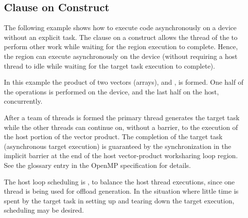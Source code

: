 \subsection{ Clause on  Construct}
\label{subsec:target_nowait_clause}

The following example shows how to execute code asynchronously on a 
device without an explicit task. The  clause on a  
construct allows the thread of the  to perform other
work while waiting for the  region execution to complete. 
Hence, the  region can execute asynchronously on the 
device (without requiring a host thread to idle while waiting for 
the target task execution to complete).

In this example the product of two vectors (arrays), 
and , is formed. One half of the operations is performed
on the device, and the last half on the host, concurrently.

After a team of threads is formed the primary thread generates 
the target task while the other threads can continue on, without a barrier,
to the execution of the host portion of the vector product.
The completion of the target task (asynchronous target execution) is 
guaranteed by the synchronization in the implicit barrier at the end of the 
host vector-product worksharing loop region. See the  
glossary entry in the OpenMP specification for details.

The host loop scheduling is , to balance the host thread executions, since 
one thread is being used for offload generation. In the situation where 
little time is spent by the target task in setting 
up and tearing down the target execution,  scheduling may be desired. 


